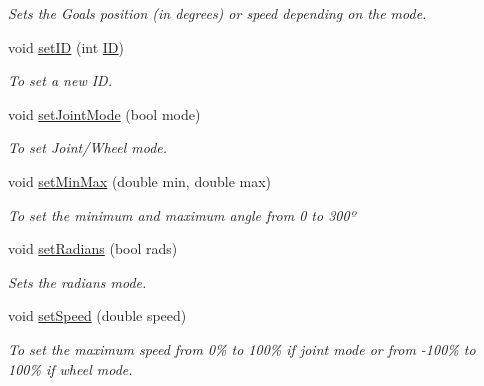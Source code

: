 \begin{DoxyCompactItemize}
\begin{DoxyCompactList}\small\item\em Sets the Goal\textquotesingle{}s position (in degrees) or speed depending on the mode. \end{DoxyCompactList}\item 
void \hyperlink{a00001_ab9fe5d0e2286985977985de6d84b1103}{set\+I\+D} (int \hyperlink{a00001_a08d272b502d65464202a3aa97825aec0ab2565d5698c9d943a8bcecf02b1389ad}{I\+D})
\begin{DoxyCompactList}\small\item\em To set a new I\+D. \end{DoxyCompactList}\item 
void \hyperlink{a00001_ac48405a5f4aa73c1f2d56f633dfbec50}{set\+Joint\+Mode} (bool mode)
\begin{DoxyCompactList}\small\item\em To set Joint/\+Wheel mode. \end{DoxyCompactList}\item 
void \hyperlink{a00001_a914864d133f8cbaf95594747aaff55f2}{set\+Min\+Max} (double min, double max)
\begin{DoxyCompactList}\small\item\em To set the minimum and maximum angle from 0 to 300º \end{DoxyCompactList}\item 
void \hyperlink{a00001_a120a8fb196ce724f118fd1774b658040}{set\+Radians} (bool rads)
\begin{DoxyCompactList}\small\item\em Sets the radians mode. \end{DoxyCompactList}\item 
void \hyperlink{a00001_a95428eea4d5165b81d80e4ab38e33b7b}{set\+Speed} (double speed)
\begin{DoxyCompactList}\small\item\em To set the maximum speed from 0\% to 100\% if joint mode or from -\/100\% to 100\% if wheel mode. \end{DoxyCompactList}\end{DoxyCompactItemize}
